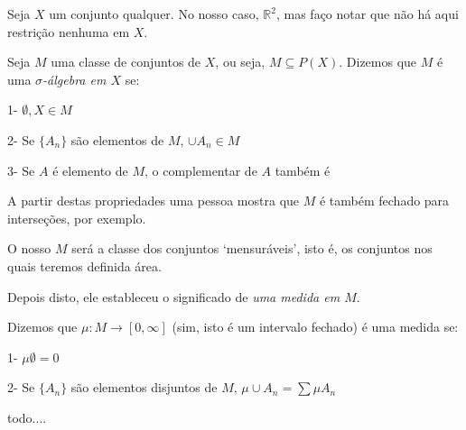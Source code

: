 \documentclass{article}
\newcommand{\R}{\mathbb{R}}
\begin{document}
Seja $X$ um conjunto qualquer. No nosso caso, $\R^2$, mas faço notar que não há aqui restrição nenhuma em $X$.

Seja $M$ uma classe de conjuntos de $X$, ou seja, $M \subseteq P(X)$. Dizemos que $M$ é uma \emph{$\sigma$-álgebra em $X$} se:

1- $\emptyset, X \in M$

2- Se $\{A_n\}$ são elementos de $M$, $\cup A_n \in M$

3- Se $A$ é elemento de $M$, o complementar de $A$ também é

A partir destas propriedades uma pessoa mostra que $M$ é também fechado para interseções, por exemplo.

O nosso $M$ será a classe dos conjuntos `mensuráveis', isto é, os conjuntos nos quais teremos definida área.

Depois disto, ele estableceu o significado de \emph{uma medida em $M$}.

Dizemos que $\mu : M \to [0, \infty]$ (sim, isto é um intervalo fechado) é uma medida se:

1- $\mu \emptyset = 0$

2- Se $\{A_n\}$ são elementos disjuntos de $M$, $\mu \cup A_n = \sum \mu A_n$

todo....
\end{document}
